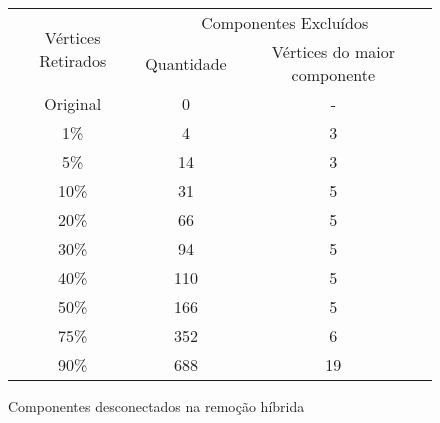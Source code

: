 \begin{figure}[!htb]
	\centering
	\begin{tabular}{|c|c|c|} \hline
		\multirow{2}{32mm}{Vértices Retirados} &\multicolumn{2}{|c|}{Componentes Excluídos} \\ \cline{2-3}
		&Quantidade &Vértices do maior componente\\ \hline\hline
		Original &0        &- \\ \hline
		1\%      &4        &3 \\ \hline
		5\%      &14       &3 \\ \hline
		10\%     &31       &5 \\ \hline
		20\%     &66       &5 \\ \hline
		30\%     &94       &5 \\ \hline
		40\%     &110      &5 \\ \hline
		50\%     &166      &5 \\ \hline
		75\%     &352      &6 \\ \hline
		90\%     &688      &19 \\ \hline
	\end{tabular}
	\caption[Componentes desconectados na remoção híbrida]{Componentes desconectados na remoção híbrida\label{qua:vertices}}
\end{figure}
